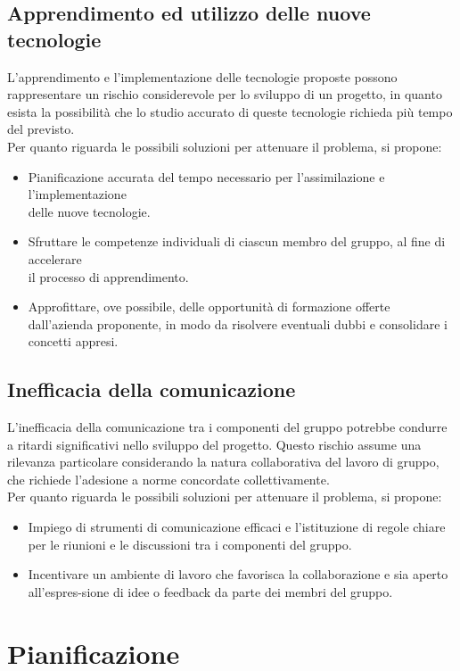 \documentclass{article}
\begin{document}
\subsection{Apprendimento ed utilizzo delle nuove tecnologie} \label{sec:rischioTec}
L’apprendimento e l'implementazione delle tecnologie proposte possono rappresentare un rischio considerevole per lo
sviluppo di un progetto, in quanto esista la possibilità che lo studio accurato di queste tecnologie richieda più tempo del previsto. \\
Per quanto riguarda le possibili soluzioni per attenuare il problema, si propone:
\begin{itemize}
    \item Pianificazione accurata del tempo necessario per l’assimilazione e l’implementazione \\delle nuove tecnologie.
    \item Sfruttare le competenze individuali di ciascun membro del gruppo, al fine di accelerare \\ il processo di apprendimento.
    \item Approfittare, ove possibile, delle opportunità di formazione offerte dall’azienda proponente, in modo da risolvere eventuali dubbi e consolidare i concetti appresi.
\end{itemize}
\subsection{Inefficacia della comunicazione}
L’inefficacia della comunicazione tra i componenti del gruppo potrebbe condurre a ritardi significativi nello sviluppo del progetto. Questo rischio assume una rilevanza particolare considerando la natura collaborativa del lavoro di gruppo, che richiede l’adesione a norme concordate collettivamente.
\\Per quanto riguarda le possibili soluzioni per attenuare il problema, si propone:
\begin{itemize}
    \item Impiego di strumenti di comunicazione efficaci e l’istituzione di regole chiare per le riunioni e le discussioni tra i componenti del gruppo.
    \item Incentivare un ambiente di lavoro che favorisca la collaborazione e sia aperto all'espres-sione di idee o feedback da parte dei membri del gruppo.
\end{itemize}


\section{Pianificazione}
\end{document}
